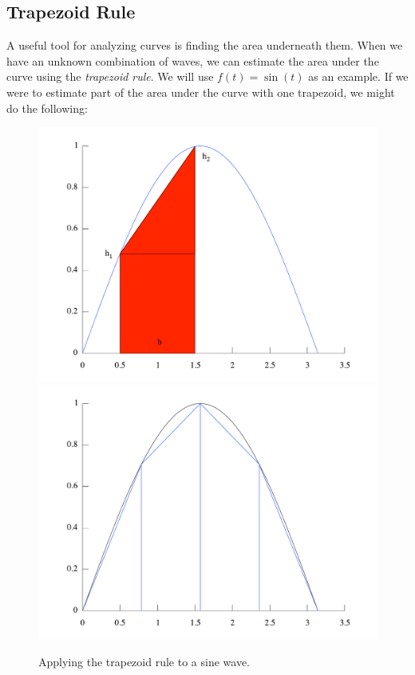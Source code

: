\documentclass{article}
\begin{document}
\subsection{Trapezoid Rule}
A useful tool for analyzing curves is finding the area underneath them.   When we have an unknown combination of waves, we can estimate the area under the curve using the {\it trapezoid rule}.  We will use $f(t)=\sin(t)$ as an example. If we were to estimate part of the area under the curve with one trapezoid, we might do the following:\\
\begin{figure}[htbp]
\begin{center}
  \includegraphics[scale=0.4]{first_trapezoid.pdf}
    \includegraphics[scale=0.4]{fourtrap.pdf}
\caption{Applying the trapezoid rule to a sine wave.}
\label{default}
\end{center}
\end{figure}
\end{document}
